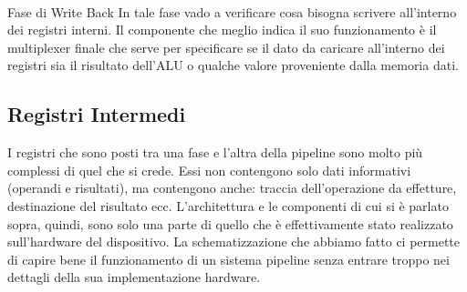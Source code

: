 \paragraph{}{Fase di Write Back}
In tale fase vado a verificare cosa bisogna scrivere all'interno dei registri interni. Il componente che meglio indica il suo funzionamento è il multiplexer finale che serve per specificare se il dato da caricare all'interno dei registri sia il risultato dell'ALU o qualche valore proveniente dalla memoria dati. 

\subsection{Registri Intermedi}
I registri che sono posti tra una fase e l'altra della pipeline sono molto più complessi di quel che si crede. Essi non contengono solo dati informativi (operandi e risultati), ma contengono anche: traccia dell'operazione da effetture, destinazione del risultato ecc. 
L'architettura e le componenti di cui si è parlato sopra, quindi, sono solo una parte di quello che è effettivamente stato realizzato sull'hardware del dispositivo.
La schematizzazione che abbiamo fatto ci permette di capire bene il funzionamento di un sistema pipeline senza entrare troppo nei dettagli della sua implementazione hardware.

